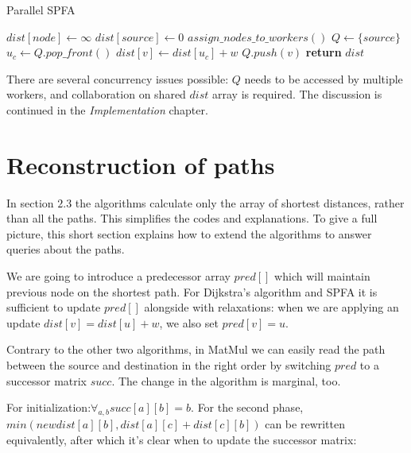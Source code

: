 \documentclass[12pt,a4paper,twoside,openright]{report}
\begin{document}
\begin{algorithm}
\caption{Parallel SPFA}\label{pspfa}
\begin{algorithmic}[1]
    \State $dist[node] \gets \infty$
\EndFor
\State $dist[source] \gets 0$
\State $assign\_nodes\_to\_workers()$
\State $Q \gets \{source\}$ 
        \State $u_c \gets Q.pop\_front()$
            \State $dist[v] \gets dist[u_c] + w$
                \State $Q.push(v)$
                \EndIf
        \EndIf
        \EndFor
      \EndFor
    \EndWhile
\State \textbf{return} $dist$
\EndProcedure
\end{algorithmic}
\end{algorithm}

There are several concurrency issues possible: $Q$ needs to be accessed by multiple workers, and collaboration on shared $dist$ array is required. The discussion is continued in the \textit{Implementation} chapter.

\section{Reconstruction of paths}
In section $2.3$ the algorithms calculate only the array of shortest distances, rather than all the paths. This simplifies the codes and explanations. To give a full picture, this short section explains how to extend the algorithms to answer queries about the paths.

We are going to introduce a predecessor array $pred[]$ which will maintain previous node on the shortest path. For Dijkstra's algorithm and SPFA it is sufficient to update $pred[]$ alongside with relaxations: when we are applying an update $dist[v] = dist[u] + w$, we also set $pred[v] = u$.

Contrary to the other two algorithms, in MatMul we can easily read the path between the source and destination in the right order by switching $pred$ to a successor matrix $succ$. The change in the algorithm is marginal, too. 

For initialization:$\displaystyle\mathop{\forall}_{a,b}succ[a][b] = b$. For the second phase, $min(newdist[a][b],dist[a][c]+dist[c][b])$ can be rewritten equivalently, after which it's clear when to update the successor matrix:
\end{document}

